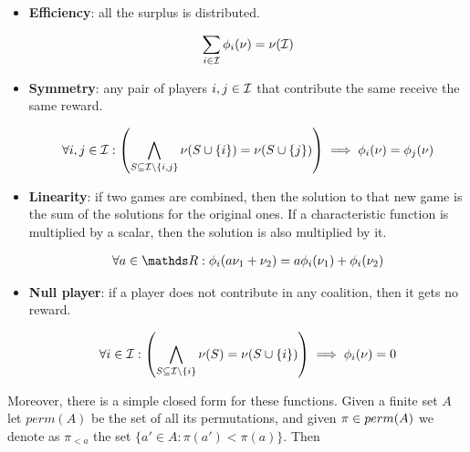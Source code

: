 \begin{itemize}
    \item \textbf{Efficiency}: all the surplus is distributed.

    \begin{align*}
        \sum_{i \in \mathcal{I}} \phi_i(\nu) = \nu(\mathcal{I})
    \end{align*}

    \item \textbf{Symmetry}: any pair of players $i,j \in \mathcal{I}$ that contribute the same receive the same reward.

    \begin{align*}
        \forall i,j \in \mathcal{I} : \left( \bigwedge_{S \subseteq \mathcal{I} \setminus \{i,j\}} \nu(S \cup \{i\}) = \nu(S \cup \{j\}) \right) \implies \phi_i(\nu) = \phi_j(\nu) 
    \end{align*}

    \item \textbf{Linearity}: if two games are combined, then the solution to that new game is the sum of the solutions for the original ones. If a characteristic function is multiplied by a scalar, then the solution is also multiplied by it.

    \begin{align*}
        \forall a \in \R : 
        \phi_i(a \charactheristicFunction_1 + \charactheristicFunction_2) =  a \phi_i(\charactheristicFunction_1) + \phi_i(\charactheristicFunction_2)
    \end{align*}

    \item \textbf{Null player}: if a player does not contribute in any coalition, then it gets no reward.

    \begin{align*}
        \forall i \in \mathcal{I} : \left( \bigwedge_{S \subseteq \mathcal{I} \setminus \{i\}} \nu(S) = \nu(S \cup \{i\}) \right) \implies \phi_i(\nu) = 0
    \end{align*}
    
\end{itemize}

Moreover, there is a simple closed form for these functions. Given a finite set $A$ let $perm(A)$ be the set of all its permutations, and given $\pi \in perm(A)$ we denote as $\pi_{<a}$ the set $\{a' \in A : \pi(a') < \pi(a)\}$. Then

